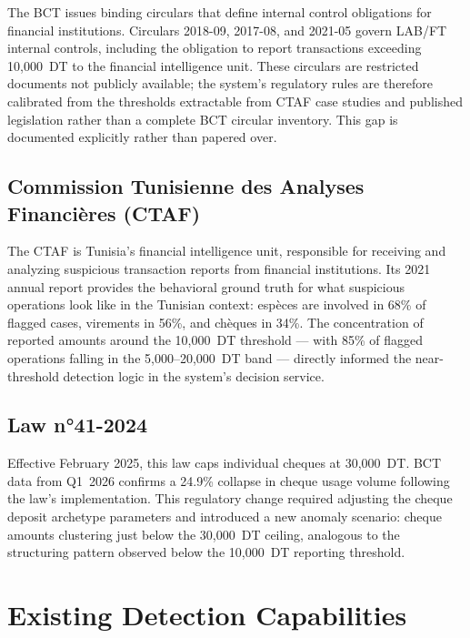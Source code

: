 The BCT issues binding circulars that define internal control obligations
for financial institutions. Circulars 2018-09, 2017-08, and 2021-05
govern LAB/FT internal controls, including the obligation to report
transactions exceeding 10,000~DT to the financial intelligence unit.
These circulars are restricted documents not publicly available; the
system's regulatory rules are therefore calibrated from the thresholds
extractable from CTAF case studies and published legislation rather than
a complete BCT circular inventory. This gap is documented explicitly
rather than papered over.

\subsection{Commission Tunisienne des Analyses Financières (CTAF)}

The CTAF is Tunisia's financial intelligence unit, responsible for
receiving and analyzing suspicious transaction reports from financial
institutions. Its 2021 annual report provides the behavioral ground truth
for what suspicious operations look like in the Tunisian context: espèces
are involved in 68\% of flagged cases, virements in 56\%, and chèques in
34\%. The concentration of reported amounts around the 10,000~DT
threshold --- with 85\% of flagged operations falling in the
5,000--20,000~DT band --- directly informed the near-threshold detection
logic in the system's decision service.

\subsection{Law n°41-2024}

Effective February 2025, this law caps individual cheques at 30,000~DT.
BCT data from Q1~2026 confirms a 24.9\% collapse in cheque usage volume
following the law's implementation. This regulatory change required
adjusting the cheque deposit archetype parameters and introduced a new
anomaly scenario: cheque amounts clustering just below the 30,000~DT
ceiling, analogous to the structuring pattern observed below the 10,000~DT
reporting threshold.


\section{Existing Detection Capabilities}
\label{sec:existing-aml}

